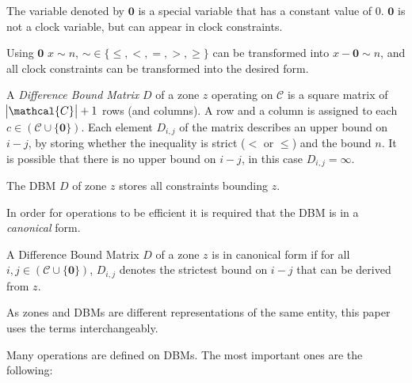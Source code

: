 \begin{dfn}
	The variable denoted by $\textbf{0}$ is a special variable that has a constant value of 0. $\textbf{0}$ is not a clock variable, but can appear in clock constraints.
\end{dfn}

Using $\textbf{0}$ $x \sim n$,  $\sim \in \{\leq,<,=,>,\geq\}$ can be transformed into $x- \textbf{0} \sim n$, and all clock constraints can be transformed into the desired form. 


\begin{dfn}
	A \emph{Difference Bound Matrix} $D$ of a zone $z$ operating on $\mathcal{C}$ is a square matrix of $\abs{\mathcal{C}}+1$ rows (and columns). A row and a column is assigned to each $c \in (\mathcal{C} \cup \{\textbf{0}\})$. Each element $D_{i,j}$ of the matrix describes an upper bound on $i - j$, by storing whether the inequality is strict ($<$ or $\leq$) and the bound $n$. It is possible that there is no upper bound on $i-j$, in this case $D_{i,j}=\infty$.
	
	The DBM $D$ of zone $z$ stores all constraints bounding $z$.
\end{dfn}

In order for operations to be efficient it is required that the DBM is in a \emph{canonical} form.

\begin{dfn}
	A Difference Bound Matrix $D$ of a zone $z$ is in canonical form if for all $i,j \in (\mathcal{C} \cup \{\textbf{0}\})$, $D_{i,j}$ denotes the strictest bound on $i-j$ that can be derived from $z$.
\end{dfn}

As zones and DBMs are different representations of the same entity, this paper uses the terms interchangeably.

Many operations are defined on DBMs. The most important ones are the following:

